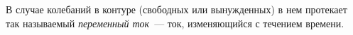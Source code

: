 \documentclass[main.tex]{subfiles}
\begin{document}
\begin{NoHyper}
В случае колебаний в контуре (свободных или вынужденных) в нем протекает так называемый \emph{переменный ток}~--- ток, изменяющийся с течением времени. 















\end{NoHyper}
\end{document}
